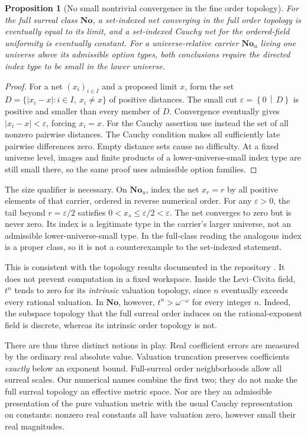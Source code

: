 \documentclass[11pt,letterpaper]{article}
\numberwithin{equation}{section}
\newtheorem{proposition}[theorem]{Proposition}
\theoremstyle{definition}
\theoremstyle{remark}
\newcommand{\No}{\mathbf{No}}
\newcommand{\cut}[2]{\left\{#1\,\middle|\,#2\right\}}
\begin{document}
\begin{proposition}[No small nontrivial convergence in the fine order topology]
\label{prop:topology}
For the full surreal class $\No$, a set-indexed net converging in the full
order topology is eventually equal to its limit, and a set-indexed Cauchy net
for the ordered-field uniformity is eventually constant. For a
universe-relative carrier $\No_u$ living one universe above its admissible
option types, both conclusions require the directed index type to be
\emph{small in the lower universe}.
\end{proposition}
\begin{proof}
For a net $(x_i)_{i\in I}$ and a proposed limit $x$, form the set
$D=\{|x_i-x|:i\in I,\ x_i\ne x\}$ of positive distances. The small cut
$\varepsilon=\cut 0D$ is positive and smaller than every member of $D$.
Convergence eventually gives $|x_i-x|<\varepsilon$, forcing $x_i=x$.
For the Cauchy assertion use instead the set of all nonzero pairwise
distances. The Cauchy condition makes all sufficiently late pairwise
differences zero. Empty distance sets cause no difficulty. At a fixed
universe level, images and finite products of a lower-universe-small index
type are still small there, so the same proof uses admissible option families.
\end{proof}

The size qualifier is necessary. On $\No_u$, index the net $x_r=r$ by all
positive elements of that carrier, ordered in reverse numerical order. For
any $\varepsilon>0$, the tail beyond $r=\varepsilon/2$ satisfies
$0<x_s\le\varepsilon/2<\varepsilon$. The net converges to zero but is never
zero. Its index is a legitimate type in the carrier's larger universe, not
an admissible lower-universe-small type. In the full-class reading the
analogous index is a proper class, so it is not a counterexample to the
set-indexed statement.

This is consistent with the topology results documented in the repository
\cite{repo}. It does not prevent computation in a fixed workspace. Inside
the Levi--Civita field, $t^n$ tends to zero for its \emph{intrinsic}
valuation topology, since $n$ eventually exceeds every rational valuation.
In $\No$, however, $t^n>\omega^{-\omega}$ for every integer $n$.
Indeed, the subspace topology that the full surreal order induces on the
rational-exponent field is discrete, whereas its intrinsic order topology
is not.

There are thus three distinct notions in play. Real coefficient errors are
measured by the ordinary real absolute value. Valuation truncation preserves
coefficients \emph{exactly} below an exponent bound. Full-surreal order
neighborhoods allow all surreal scales. Our numerical names combine the
first two; they do not make the full surreal topology an effective metric
space. Nor are they an admissible presentation of the pure valuation metric
with the usual Cauchy representation on constants: nonzero real constants
all have valuation zero, however small their real magnitudes.
\end{document}
